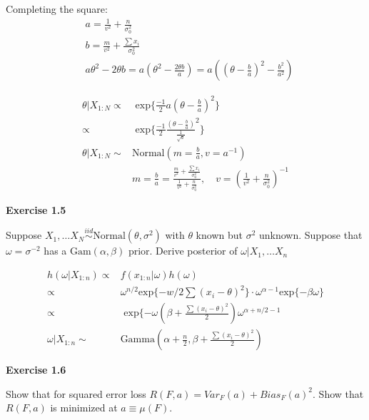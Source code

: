 \documentclass[12pt]{article}
\begin{document}
    \hline

    Completing the square:
    \begin{align*}
        &a =  \frac{1}{v^2} + \frac{n}{\sigma_0 ^2} \\
        &b =  \frac{m}{v^2} + \frac{\sum x_i}{\sigma_0 ^2} \\
        &a \theta ^2 - 2 \theta b = a ( \theta ^2 - \frac{2 \theta b}{a}) =
           a ( (\theta - \frac{b}{a})^2 - \frac{b^2}{a^2})
    \end{align*}
    \hline

    \begin{align*}
    \theta | X_{1:N} \propto& \text{ exp} \big \{ \frac{-1}{2} a (\theta - \frac{b}{a})^2 \big \} \\
        \propto&  \text{ exp} \big \{ \frac{-1}{2} \frac{(\theta - \frac{b}{a})}{\frac{1}{\sqrt{a}}}^2 \big \} \\
    \theta | X_{1:N} \sim& \text{Normal}(m = \frac{b}{a}, v = a^{-1}) \\
    &m = \frac{b}{a}  = \frac{\frac{m}{v^2} + \frac{\sum x_i}{\sigma_0 ^2}} {\frac{1}{v^2} + \frac{n}{\sigma_0 ^2} },
        \quad v = (\frac{1}{v^2} + \frac{n}{\sigma_0 ^2})^{-1}
    \end{align*}


    \noindent \textbf{Exercise 1.5}

    Suppose \(X_1, \dots X_N \stackrel{iid}{\sim} \text{Normal}(\theta, \sigma ^2) \) with \(\theta\) known
    but \(\sigma ^2\) unknown. Suppose that \(\omega = \sigma^{-2}\) has a \(\text{Gam}(\alpha, \beta)\) prior.
    Derive posterior of \(\omega | X_1, \dots X_n\)

    \begin{align*}
      h(\omega | X_{1:n}) \propto& f(x_{1:n}|\omega) h(\omega)\\
        \propto& \omega^{n/2} \text{exp} \{ -w/2 \sum (x_i - \theta)^2  \} \cdot \omega^{\alpha -1}
             \text{exp} \{ -\beta \omega \} \\
        \propto& \text{ exp} \{ -\omega ( \beta + \frac{\sum (x_i - \theta)^2}{2}) \omega^{\alpha + n/2 -1}\\
      \omega | X_{1:n} \sim& \text{Gamma}(\alpha + \frac{n}{2}, \beta + \frac{\sum (x_i - \theta)^2}{2})
    \end{align*}

    \noindent \textbf{Exercise 1.6}

    Show that for squared error loss \(R(F,a) = Var_F (a) + Bias_F (a) ^2\). Show that \(R(F,a)\) is minimized
    at \(a \equiv \mu(F)\).
    
\end{document}
